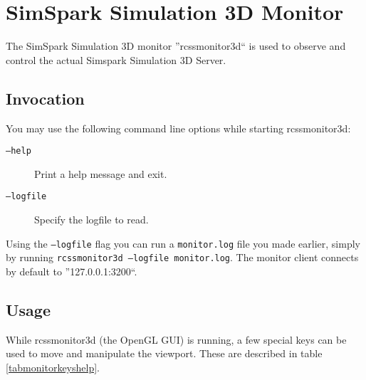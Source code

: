 \chapter{SimSpark Simulation 3D Monitor}
\label{chSimulator}
The SimSpark Simulation 3D monitor ''rcssmonitor3d`` is used to observe and control the actual Simspark Simulation 3D Server.
\section{Invocation}

You may use the following command line options while starting rcssmonitor3d:
\begin{description}
\item[{\tt --help}] Print a help message and exit.
\item[{\tt --logfile}] Specify the logfile to read.
\end{description}

Using the {\tt --logfile} flag you can run a {\tt monitor.log} file you made earlier, simply by running {\tt rcssmonitor3d --logfile monitor.log}.
The monitor client connects by default to ''127.0.0.1:3200``.

\section{Usage}

While rcssmonitor3d (the OpenGL GUI) is running, a few special keys can be used to move and manipulate the viewport. These are described in table \ref{tabmonitorkeyshelp}.

